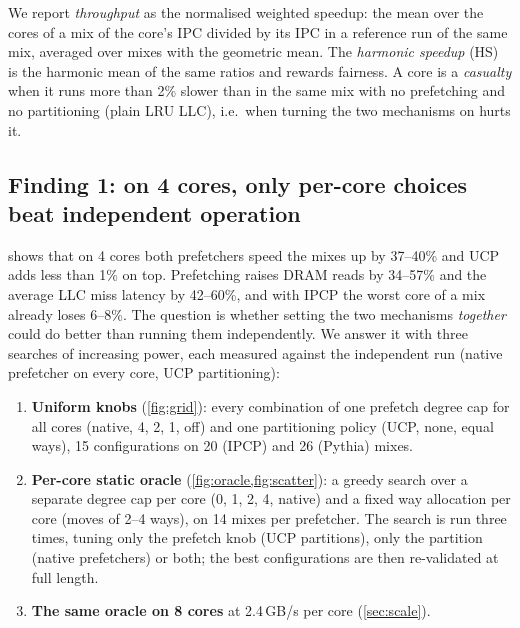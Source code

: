 We report \emph{throughput} as the normalised weighted speedup: the mean over the cores of a mix of the core's IPC
divided by its IPC in a reference run of the same mix, averaged over mixes with the geometric mean.  The
\emph{harmonic speedup} (HS) is the harmonic mean of the same ratios and rewards fairness.  A core is a
\emph{casualty} when it runs more than 2\% slower than in the same mix with no prefetching and no partitioning (plain
LRU LLC), i.e.\ when turning the two mechanisms on hurts it.

\subsection{Finding 1: on 4 cores, only per-core choices beat independent operation}
\label{sec:headroom}

\begin{table}[!htbp]
\centering
\caption{4-core characterisation runs (IPCP: one DRAM channel, Pythia: two; 50\,M + 200\,M instructions per core):
speedup over UCP without prefetching, and change of DRAM reads and LLC miss latency with prefetching.}
\label{tab:char4}
\footnotesize
\resizebox{\columnwidth}{!}{}
\end{table}

 shows that on 4 cores both prefetchers speed the mixes up by 37--40\% and UCP adds less than 1\% on
top.  Prefetching raises DRAM reads by 34--57\% and the average LLC miss latency by 42--60\%, and with IPCP the worst
core of a mix already loses 6--8\%.  The question is whether setting the two mechanisms \emph{together} could do
better than running them independently.  We answer it with three searches of increasing power, each measured against
the independent run (native prefetcher on every core, UCP partitioning):
\begin{enumerate}
  \item \textbf{Uniform knobs} (\cref{fig:grid}): every combination of one prefetch degree cap for all cores (native,
        4, 2, 1, off) and one partitioning policy (UCP, none, equal ways), 15 configurations on 20 (IPCP) and 26
        (Pythia) mixes.
  \item \textbf{Per-core static oracle} (\cref{fig:oracle,fig:scatter}): a greedy search over a separate degree
        cap per core (0, 1, 2, 4, native) and a fixed way allocation per core (moves of 2--4 ways), on 14 mixes per
        prefetcher.  The search is run three times, tuning only the prefetch knob (UCP partitions), only the
        partition (native prefetchers) or both; the best configurations are then re-validated at full length.
  \item \textbf{The same oracle on 8 cores} at 2.4\,GB/s per core (\cref{sec:scale}).
\end{enumerate}

